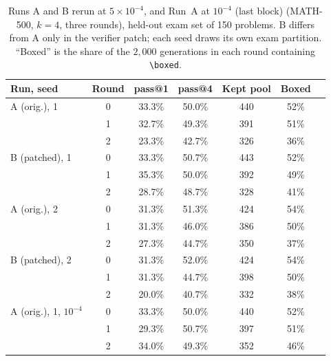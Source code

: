 \documentclass[runningheads]{llncs}
\begin{document}
\begin{table}[t]
\caption{Runs A and B rerun at $5\times10^{-4}$, and Run~A at $10^{-4}$ (last
block) (MATH-500, $k=4$, three rounds), held-out exam set of 150 problems. B differs from A only in the
verifier patch; each seed draws its own exam partition. ``Boxed'' is the share
of the $2{,}000$ generations in each round containing
\texttt{\textbackslash boxed}.}
\label{tab:lrcheck}
\centering
\setlength{\tabcolsep}{6pt}
\begin{tabular}{lcccccc}
\toprule
Run, seed & Round & pass@1 & pass@4 & Kept pool & Boxed \\
\midrule
A (orig.), 1   & 0 & 33.3\% & 50.0\% & 440 & 52\% \\
               & 1 & 32.7\% & 49.3\% & 391 & 51\% \\
               & 2 & 23.3\% & 42.7\% & 326 & 36\% \\
B (patched), 1 & 0 & 33.3\% & 50.7\% & 443 & 52\% \\
               & 1 & 35.3\% & 50.0\% & 392 & 49\% \\
               & 2 & 28.7\% & 48.7\% & 328 & 41\% \\
\midrule
A (orig.), 2   & 0 & 31.3\% & 51.3\% & 424 & 54\% \\
               & 1 & 31.3\% & 46.0\% & 386 & 50\% \\
               & 2 & 27.3\% & 44.7\% & 350 & 37\% \\
B (patched), 2 & 0 & 31.3\% & 52.0\% & 424 & 54\% \\
               & 1 & 31.3\% & 44.7\% & 398 & 50\% \\
               & 2 & 20.0\% & 40.7\% & 332 & 38\% \\
\midrule
A (orig.), 1, $10^{-4}$ & 0 & 33.3\% & 50.0\% & 440 & 52\% \\
               & 1 & 29.3\% & 50.7\% & 397 & 51\% \\
               & 2 & 34.0\% & 49.3\% & 352 & 46\% \\
\bottomrule
\end{tabular}
\end{table}
\end{document}
